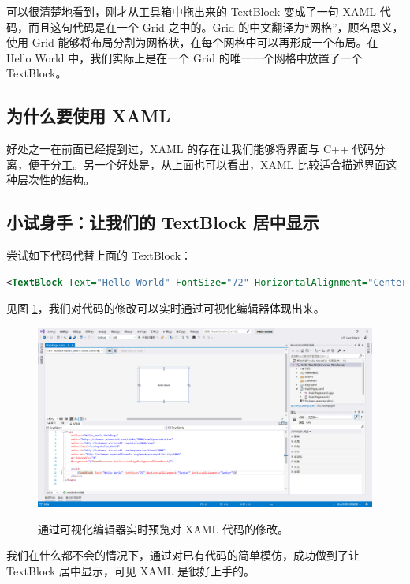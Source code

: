 可以很清楚地看到，刚才从工具箱中拖出来的 TextBlock 变成了一句 XAML 代码，而且这句代码是在一个 Grid 之中的。Grid 的中文翻译为``网格''，顾名思义，使用 Grid 能够将布局分割为网格状，在每个网格中可以再形成一个布局。在 Hello World 中，我们实际上是在一个 Grid 的唯一一个网格中放置了一个 TextBlock。

\subsection{为什么要使用 XAML}

好处之一在前面已经提到过，XAML 的存在让我们能够将界面与 C++ 代码分离，便于分工。另一个好处是，从上面也可以看出，XAML 比较适合描述界面这种层次性的结构。

\subsection{小试身手：让我们的 TextBlock 居中显示}

尝试如下代码代替上面的 TextBlock：
\begin{lstlisting}[language = xml]
    <TextBlock Text="Hello World" FontSize="72" HorizontalAlignment="Center" VerticalAlignment="Center"/>
\end{lstlisting}

见图 \ref{pic15}，我们对代码的修改可以实时通过可视化编辑器体现出来。
\begin{figure}[htbp]
    \centering
    \includegraphics[width = 0.75\paperwidth]{pic/15.png}
    \label{pic15}
    \caption{通过可视化编辑器实时预览对 XAML 代码的修改。}
\end{figure}

我们在什么都不会的情况下，通过对已有代码的简单模仿，成功做到了让 TextBlock 居中显示，可见 XAML 是很好上手的。